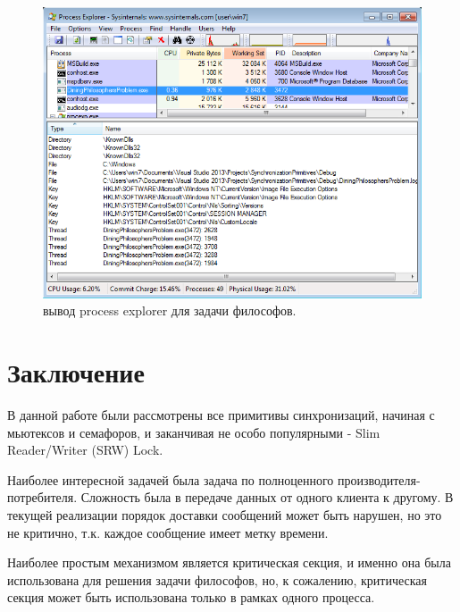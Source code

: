 \documentclass[a4paper, 12pt]{article}		%
\begin{document}
\begin{figure}[h!]
\centering
\includegraphics[scale=0.7]{res/pe_10}
\caption{вывод process explorer для задачи философов.}
\end{figure}

\newpage
\section*{Заключение}

В данной работе были рассмотрены все примитивы синхронизаций, начиная с мьютексов и семафоров, и заканчивая не особо популярными - Slim Reader/Writer (SRW) Lock.

Наиболее интересной задачей была задача по полноценного производителя-потребителя. Сложность была в передаче данных от одного клиента к другому. В текущей реализации порядок доставки сообщений может быть нарушен, но это не критично, т.к. каждое сообщение имеет метку времени.

Наиболее простым механизмом является критическая секция, и именно она была использована для решения задачи философов, но, к сожалению, критическая секция может быть использована только в рамках одного процесса.
\end{document}
